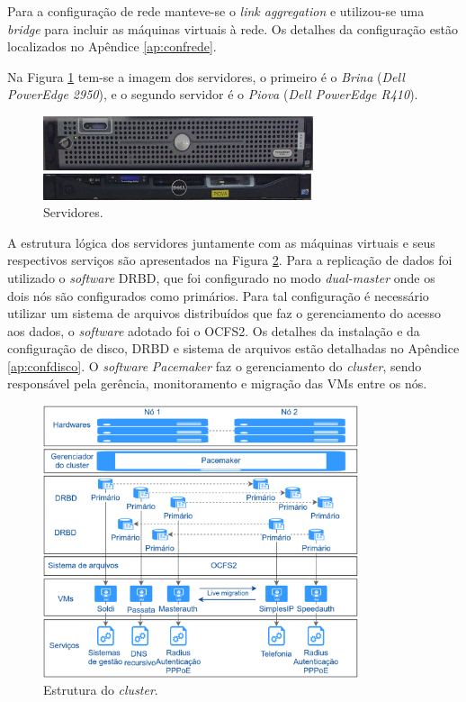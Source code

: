 Para a configuração de rede manteve-se o \textit{link aggregation} e utilizou-se uma \textit{bridge} para incluir as máquinas virtuais à rede.
Os detalhes da configuração estão localizados no Apêndice \ref{ap:confrede}.

Na Figura \ref{fig:servidores_brina_piova} tem-se a imagem dos servidores, o primeiro é o \textit{Brina} (\textit{Dell PowerEdge 2950}), 
e o segundo servidor é o \textit{Piova} (\textit{Dell PowerEdge R410}).

\begin{figure}[h!]
 \centering
 \includegraphics[width=300px]{img/servidores_brina_piova.eps}
 \caption{Servidores.}
 \label{fig:servidores_brina_piova}
\end{figure}

A estrutura lógica dos servidores juntamente com as máquinas virtuais e seus respectivos serviços são apresentados na Figura 
\ref{fig:projeto_estrutura}. Para a replicação de dados foi utilizado o \textit{software} \ac{DRBD}, que foi configurado no modo 
\textit{dual-master} onde os dois nós são configurados como primários. Para tal configuração é necessário utilizar um sistema de arquivos 
distribuídos que faz o gerenciamento do acesso aos dados, o \textit{software} adotado foi o \ac{OCFS2}. 
Os detalhes da instalação e da configuração de disco, \ac{DRBD} e sistema de arquivos estão detalhadas no Apêndice \ref{ap:confdisco}. 
O \textit{software} \textit{Pacemaker} faz o gerenciamento do \textit{cluster}, sendo responsável pela gerência, monitoramento e migração das 
\acp{VM} entre os nós.

\begin{figure}[h!]
 \centering
 \includegraphics[width=350px]{img/projeto_estrutura.eps}
 \caption{Estrutura do \textit{cluster}.}
 \label{fig:projeto_estrutura}
\end{figure}

